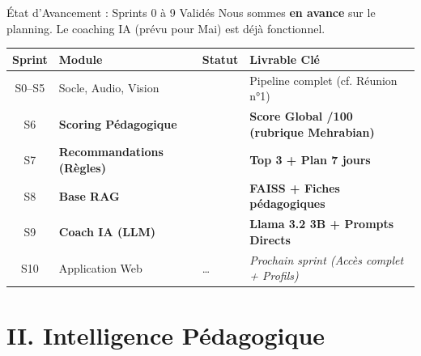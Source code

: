 \documentclass[10pt,aspectratio=169]{beamer}
\newcommand{\cmark}{\textcolor{success}{\ding{51}}}%
\begin{document}
\begin{frame}{État d'Avancement : Sprints 0 à 9 Validés}
    \small Nous sommes \textbf{en avance} sur le planning. Le coaching IA (prévu pour Mai) est déjà fonctionnel.
    \vspace{0.2cm}
    \begin{imageframe}
        \scriptsize
        \begin{tabular}{clll}
            \toprule
            \textbf{Sprint} & \textbf{Module} & \textbf{Statut} & \textbf{Livrable Clé} \\
            \midrule
            S0--S5 & Socle, Audio, Vision & \cmark & Pipeline complet (cf. Réunion n°1) \\
            \rowcolor{accent!10}
            S6 & \textbf{Scoring Pédagogique} & \cmark & \textbf{Score Global /100 (rubrique Mehrabian)} \\
            \rowcolor{accent!10}
            S7 & \textbf{Recommandations (Règles)} & \cmark & \textbf{Top 3 + Plan 7 jours} \\
            \rowcolor{accent!10}
            S8 & \textbf{Base RAG} & \cmark & \textbf{FAISS + Fiches pédagogiques} \\
            \rowcolor{accent!10}
            S9 & \textbf{Coach IA (LLM)} & \cmark & \textbf{Llama 3.2 3B + Prompts Directs} \\
            \midrule
            S10 & Application Web & \dots & \textit{Prochain sprint (Accès complet + Profils)} \\
            \bottomrule
        \end{tabular}
    \end{imageframe}
\end{frame}

\section{II. Intelligence Pédagogique}
\end{document}
